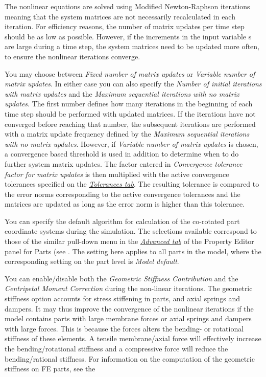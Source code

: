 \begin{bulletlist}
  \setcounter{enumi}{2}
\item
  The nonlinear equations are solved using Modified Newton-Raphson iterations
  meaning that the system matrices are not necessarily recalculated in each
  iteration. For efficiency reasons, the number of matrix updates per time step
  should be as low as possible. However, if the increments in the input variable
  s are large during a time step, the system matrices need to be updated more
  often, to ensure the nonlinear iterations converge.

  You may choose between {\sl Fixed number of matrix updates} or
  {\sl Variable number of matrix updates}. In either case you can also specify
  the {\sl Number of initial iterations with matrix updates} and
  the {\sl Maximum sequential iterations with no matrix updates}.
  The first number defines how many iterations in the beginning of each time
  step should be performed with updated matrices. If the iterations have not
  converged before reaching that number, the subsequent iterations are performed
  with a matrix update frequency defined by the
  {\sl Maximum sequential iterations with no matrix updates}.
  However, if {\sl Variable number of matrix updates} is chosen,
  a convergence based threshold is used in addition to determine when to
  do further system matrix updates.
  The factor entered in {\sl Convergence tolerance factor for matrix updates}
  is then multiplied with the active convergence tolerances specified on the
  \protect\hyperlink{tolerances-tab}{\sl Tolerances tab}.
  The resulting tolerance is compared to the error norms corresponding to the
  active convergence tolerances and the matrices are updated
  as long as the error norm is higher than this tolerance.

\item You can specify the default algorithm for
  calculation of the co-rotated part coordinate systems during the simulation.
  The selections available correspond to those of the similar pull-down menu in
  the \protect\hyperlink{advanced-tab}{\sl Advanced tab} of the Property Editor
  panel for Parts (see .
  The setting here applies to all parts in the model, where the corresponding
  setting on the part level is {\sl Model default}.

\item You can enable/disable both the
  {\sl Geometric Stiffness Contribution} and the
  {\sl Centripetal Moment Correction} during the non-linear iterations.
  The geometric stiffness option accounts for stress stiffening in parts,
  and axial springs and dampers. It may thus improve the convergence of
  the nonlinear iterations if the model contains parts with large membrane
  forces or axial springs and dampers with large forces. This is because
  the forces alters the bending- or rotational stiffness of these elements.
  A tensile membrane/axial force will effectively increase the
  bending/rotational stiffness and a compressive force will reduce the
  bending/rational stiffness. For information on the computation of the
  geometric stiffness on FE parts, see the


\end{bulletlist}
